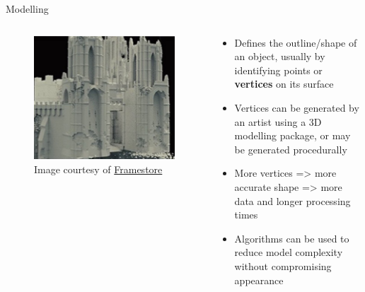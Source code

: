 \begin{frame}{Modelling}
	\begin{columns}
		\begin{column}{0.3\textwidth}
			\begin{figure}
				\includegraphics[width=\textwidth]{castle_model}
				\caption*{Image courtesy of \href{https://www.framestore.com}{Framestore}}
			\end{figure}
		\end{column}
		\begin{column}{0.65\textwidth}
			\begin{itemize}
				\pause\item Defines the outline/shape of an object, usually by identifying points or \textbf{vertices} on its surface
				\pause\item Vertices can be generated by an artist using a 3D modelling package, or may be generated procedurally
				\pause\item More vertices => more accurate shape => more data and longer processing times
				\pause\item Algorithms can be used to reduce model complexity without compromising appearance
			\end{itemize}
		\end{column}
	\end{columns}
\end{frame}

